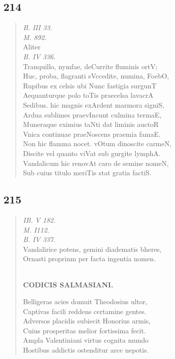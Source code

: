 \documentclass[11pt, a4paper]{report}
\begin{document}
            \subsection*{214}
      \begin{verse}
      \textit{B. III 33.} \\ \textit{M. 892.} \\ Aliter \\ \textit{B. IV 336.} \\ Tranquillo,  nymfae, deCurrite fluminis   ortV; \\ Huc, proba, flagranti sVccedite, numina, FoebO, \\ Rupibus ex celsis ubi  Nunc fastigia   surgunT \\ Aequanturque polo    toTis praecelsa   lavacrA \\ Sedibus. hic magnis  exArdent marmora   signiS, \\ Ardua sublimes    praevIncunt culmina   termaE, \\ Muneraque eximius    taNti dat liminis  auctoR \\ Vnica continuae    praeNoscens praemia   famaE. \\ Non hic flamma nocet. vOtum dinoscite   carmeN, \\ Discite vel quanto   viVat sub gurgite  lymphA. \\ Vandalicum hic    renovAt caro de semine nomeN, \\ Sub cuius titulo   meriTis stat gratia  factiS. \\ 
      \end{verse}
  
            \subsection*{215}
      \begin{verse}
      \textit{IB. V 182.} \\ \textit{M. I112.} \\ \textit{B. IV 337.} \\ Vandalirice potens, gemini diadematis bheres, \\ Ornasti proprinm per facta ingentia nomen. \\ 
        ﻿\pagebreak 
    \begin{center} \textbf{CODICIS SALMASIANI.} \end{center}Belligeras acies domuit Theodosius ultor, \\ Captivas facili reddens certamine gentes. \\ Adversos placidis subiecit Honorius armis, \\ Cuius prosperitas melior fortissima fecit. \\ Ampla Valentiniani virtus cognita mundo \\ Hostibus addictis ostenditur arce nepotis. \\ 
      \end{verse}
  
\end{document}
